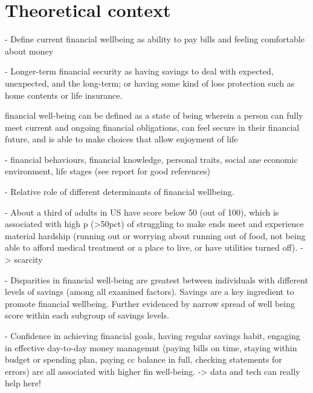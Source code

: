 
\section{Theoretical context}%
\label{sec:theoretical_context}




\citet{mps2018building}
- Define current financial wellbeing as ability to pay bills and feeling
comfortable about money

- Longer-term financial security as having savings to deal with expected,
unexpected, and the long-term; or having some kind of loss protection such as
home contents or life insurance.


\citet{cfpb2015financial}
financial well-being can be defined as a state of being wherein a person can fully meet current and ongoing financial obligations, can feel secure in their financial future, and is able to make choices that allow enjoyment of life




\citet{cfpb2015financial}
- financial behaviours, financial knowledge, personal traits, social ane economic
environment, life stages (see report for good references)

\citet{cfpb2017financial}
- Relative role of different determinants of financial wellbeing.

- About a third of adults in US have score below 50 (out of 100), which is
associated with high p (>50pct) of struggling to make ends meet and experience
material hardship (running out or worrying about running out of food, not being
able to afford medical treatment or a place to live, or have utilities turned
off). -> scarcity 

- Disparities in financial well-being are greatest between individuals with
different levels of savings (among all examined factors). Savings are a key
ingredient to promote financial wellbeing. Further evidenced by narrow spread
of well being score within each subgroup of savings levels. 

- Confidence in achieving financial goals, having regular savings habit,
engaging in effective day-to-day money managemnt (paying bills on time, staying
within budget or spending plan, paying cc balance in full, checking statements
for errors) are all associated with higher fin well-being. -> data and tech can
really help here!

